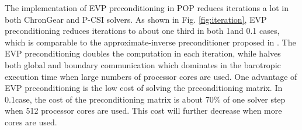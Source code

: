 The implementation of EVP preconditioning in POP reduces iterations a lot in both ChronGear and P-CSI solvers. 
As shown in Fig. \ref{fig:iteration}, EVP preconditioning reduces  iterations to about one third in both 1\degree and 0.1 \degree cases, which is comparable to the approximate-inverse preconditioner proposed in \cite{smith1992parallel}. 
The EVP preconditioning doubles the computation in each iteration, while halves both global  and boundary communication which dominates in the barotropic execution time when large numbers of processor cores are used.
One advantage of EVP preconditioning is the low cost of solving the preconditioning matrix. 
In 0.1\degree case, the cost of the preconditioning matrix is about 70\% of one solver step when 512 processor cores are used. 
This cost will further decrease when more cores are used. 
